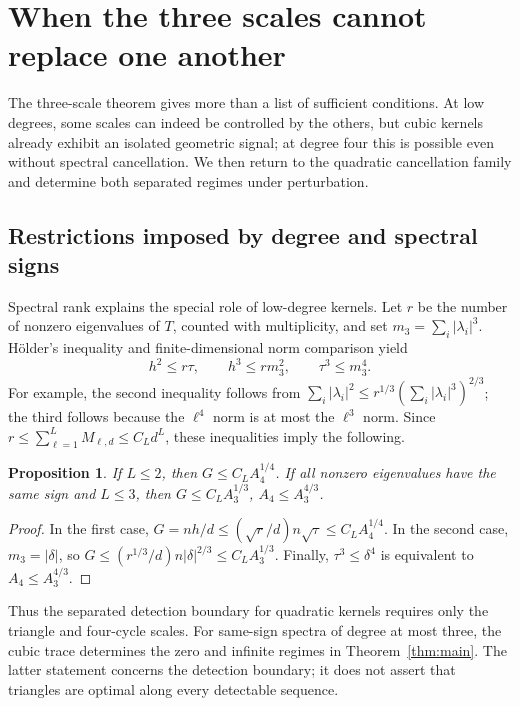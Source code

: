 \documentclass[11pt,reqno]{amsart}
\numberwithin{equation}{section}
\newtheorem{proposition}[theorem]{Proposition}
\theoremstyle{definition}
\theoremstyle{remark}
\theoremstyle{definition}
\begin{document}
\section{When the three scales cannot replace one another}\label{sec:structure}
The three-scale theorem gives more than a list of sufficient conditions.
At low degrees, some scales can indeed be controlled by the others,
but cubic kernels already exhibit an isolated geometric signal; at degree four this is possible even without spectral cancellation.
We then return to the quadratic cancellation family and determine both separated regimes under perturbation.

\subsection{Restrictions imposed by degree and spectral signs}
Spectral rank explains the special role of low-degree kernels.
Let $r$ be the number of nonzero eigenvalues of $T$, counted with multiplicity, and set
$m_3=\sum_i|\lambda_i|^3$. H\"older's inequality and finite-dimensional norm comparison yield
\begin{equation}\label{eq:rank-bounds}
 h^2\le r\tau,\qquad h^3\le r m_3^2,\qquad \tau^3\le m_3^4.
\end{equation}
For example, the second inequality follows from
$\sum_i|\lambda_i|^2\le r^{1/3}(\sum_i|\lambda_i|^3)^{2/3}$; 
the third follows because the $\ell^4$ norm is at most the $\ell^3$ norm.
Since $r\le\sum_{\ell=1}^LM_{\ell,d}\le C_Ld^L$, these inequalities imply the following.

\begin{proposition}\label{prop:absorption}
If $L\le2$, then $G\le C_LA_4^{1/4}$.
If all nonzero eigenvalues have the same sign and $L\le3$, then
$G\le C_LA_3^{1/3}$, $A_4\le A_3^{4/3}$.
\end{proposition}
\begin{proof}
In the first case,
$G=nh/d\le(\sqrt r/d)n\sqrt\tau\le C_LA_4^{1/4}$.
In the second case, $m_3=|\delta|$, so
$G\le(r^{1/3}/d)n|\delta|^{2/3}\le C_LA_3^{1/3}$.
Finally, $\tau^3\le\delta^4$ is equivalent to $A_4\le A_3^{4/3}$.
\end{proof}
Thus the separated detection boundary for quadratic kernels requires only the triangle and four-cycle scales.
For same-sign spectra of degree at most three, the cubic trace determines the zero and infinite regimes in Theorem~\ref{thm:main}.
The latter statement concerns the detection boundary; it does not assert that triangles are optimal along every detectable sequence.
\end{document}
